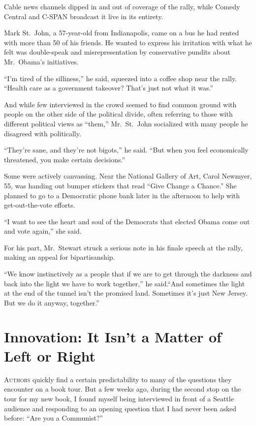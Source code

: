 ﻿\documentclass[12pt]{article}
\begin{document}
Cable news channels dipped in and out of coverage of the rally, while Comedy Central and C-SPAN
broadcast it live in its entirety.

Mark St.~John, a 57-year-old from Indianapolis, came on a bus he had rented with more than 50 of his
friends. He wanted to express his irritation with what he felt was double-speak and
misrepresentation by conservative pundits about Mr.~Obama's initiatives.

``I'm tired of the silliness,'' he said, squeezed into a coffee shop near the rally. ``Health care
as a government takeover? That's just not what it was.''

And while few interviewed in the crowd seemed to find common ground with people on the other side of
the political divide, often referring to those with different political views as ``them,''
Mr.~St.~John socialized with many people he disagreed with politically.

``They're sane, and they're not bigots,'' he said. ``But when you feel economically threatened, you
make certain decisions.''

Some were actively canvassing. Near the National Gallery of Art, Carol Newmyer, 55, was handing out
bumper stickers that read ``Give Change a Chance.'' She planned to go to a Democratic phone bank
later in the afternoon to help with get-out-the-vote efforts.

``I want to see the heart and soul of the Democrats that elected Obama come out and vote again,''
she said.

For his part, Mr.~Stewart struck a serious note in his finale speech at the rally, making an appeal
for bipartisanship.

``We know instinctively as a people that if we are to get through the darkness and back into the
light we have to work together,'' he said.``And sometimes the light at the end of the tunnel isn't
the promised land. Sometimes it's just New Jersey. But we do it anyway, together.''

\section{Innovation: It Isn't a Matter of Left or Right}

\lettrine{A}{uthors} quickly find a certain predictability to many of the
questions they encounter on a book tour. But a few weeks ago, during the second stop on the tour for
my new book, I found myself being interviewed in front of a Seattle audience and responding to an
opening question that I had never been asked before: ``Are you a Communist?''
\end{document}
